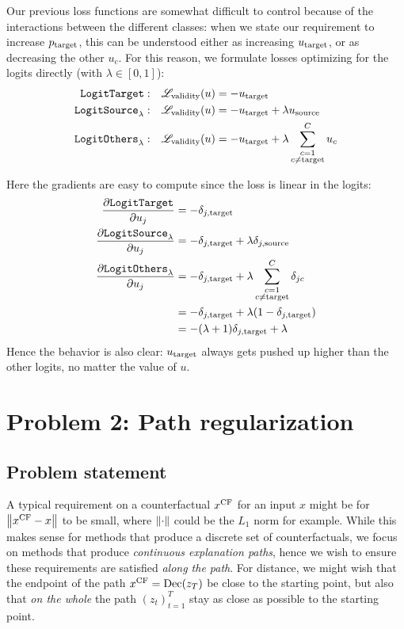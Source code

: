 \documentclass[../main.tex]{subfiles}
\begin{document}
Our previous loss functions are somewhat difficult to control because of the interactions between the different classes:
when we state our requirement to increase $p_{\mathrm{target}}$, this can be understood either as increasing $u_{\mathrm{target}}$, or as decreasing the other $u_c$.
For this reason, we formulate losses optimizing for the logits directly (with $\lambda \in [0, 1]$):
\begin{align*}
    \mathtt{LogitTarget}{}:        & \quad    \mathscr{L}_\text{validity}(u) = - u_{\mathrm{target}}                         \\
    \mathtt{LogitSource}_{\lambda}: & \quad     \mathscr{L}_\text{validity}(u) = - u_{\mathrm{target}} + \lambda u_{\mathrm{source}}    \\
    \mathtt{LogitOthers}_{\lambda}: & \quad    \mathscr{L}_\text{validity}(u) = - u_{\mathrm{target}} + \lambda \sum_{\substack{{c}=1 \\ {c} \neq \mathrm{target}}}^C u_c
\end{align*}

Here the gradients are easy to compute since the loss is linear in the logits:
\begin{align*}
\frac{\partial \mathtt{LogitTarget}{}}{\partial u_j} &= - \delta_{j, \mathrm{target}}                         \\
\frac{\partial \mathtt{LogitSource}_{\lambda}}{\partial u_j} &= - \delta_{j, \mathrm{target}} + \lambda \delta_{j, \mathrm{source}}                        \\
\frac{\partial \mathtt{LogitOthers}_{\lambda}}{\partial u_j}
&= - \delta_{j, \mathrm{target}} + \lambda \sum_{\substack{{c}=1 \\ {c} \neq \mathrm{target}}}^C \delta_{jc} \\
&= - \delta_{j, \mathrm{target}} + \lambda (1 - \delta_{j, \mathrm{target}}) \\
&= -(\lambda + 1)\delta_{j, \mathrm{target}} + \lambda
\end{align*}
Hence the behavior is also clear: $u_{\mathrm{target}}$ always gets pushed up higher than the other logits, no matter the value of $u$.



\section{Problem 2: Path regularization}

\subsection{Problem statement}

A typical requirement on a counterfactual $x^\mathrm{CF}$ for an input $x$ might be for $\left\lVert x^\mathrm{CF} - x\right\rVert$ to be small, where $\left\lVert\cdot\right\rVert$ could be the $L_1$ norm for example.
While this makes sense for methods that produce a discrete set of counterfactuals, we focus on methods that produce \emph{continuous explanation paths}, hence we wish to ensure these requirements are satisfied \emph{along the path}.
For distance, we might wish that the endpoint of the path $x^\mathrm{CF} = \operatorname{Dec}(z_T)$ be close to the starting point, but also that \emph{on the whole} the path $(z_t)_{t=1}^T$ stay as close as possible to the starting point.
\end{document}
